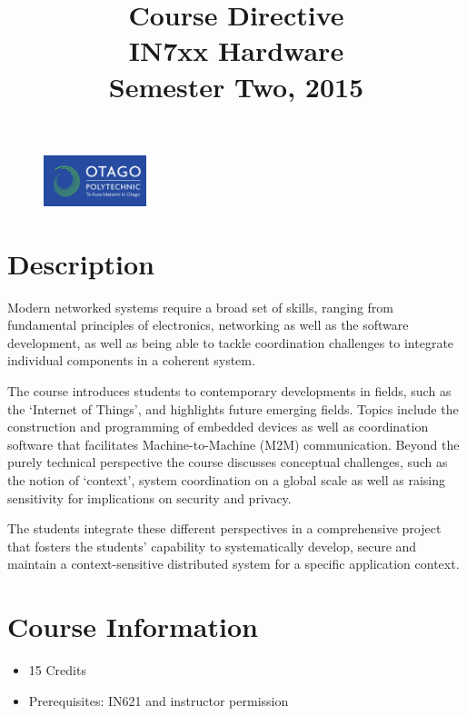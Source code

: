 \documentclass{article}
\begin{document}
\begin{figure}
\includegraphics[width=30mm]{../../../resources/images/oplogo.png}
\end{figure}

\title{Course Directive\\IN7xx Hardware\\Semester Two, 2015}
\date{}
\maketitle

\section*{Description}
Modern networked systems require a broad set of skills, ranging from fundamental principles of electronics, networking as well as the software development, as well as being able to tackle coordination challenges to integrate individual components in a coherent system. 

The course introduces students to contemporary developments in fields, such as the `Internet of Things', and highlights future emerging fields. Topics include the construction and programming of embedded devices as well as coordination software that facilitates Machine-to-Machine (M2M) communication. Beyond the purely technical perspective the course discusses conceptual challenges, such as the notion of `context', system coordination on a global scale as well as raising sensitivity for implications on security and privacy. 

The students integrate these different perspectives in a comprehensive project that fosters the students' capability to systematically develop, secure and maintain a context-sensitive distributed system for a specific application context. 


\section*{Course Information}
\begin{itemize}
  \item 15 Credits
  \item Prerequisites: IN621 and instructor permission
\end{itemize}
\end{document}
